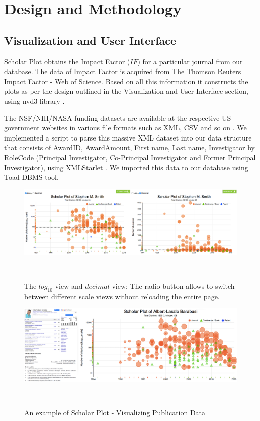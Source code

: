 \chapter{Design and Methodology}\label{chap:Methods }
\section{Visualization and User Interface}
Scholar Plot obtains the Impact Factor ($IF$) for a particular journal from our database. The data of Impact Factor is acquired from The Thomson Reuters Impact Factor - Web of Science. Based on all this information it constructs the plots as per the design outlined in the Visualization and User Interface section, using nvd3 library \cite{nvd3org}.


The NSF/NIH/NASA funding datasets are available at the respective US government websites in various file formats such as XML, CSV and so on \cite{nsf, nih}. We implemented a script to parse this massive XML dataset into our data structure that consists of AwardID, AwardAmount, First name, Last name, Investigator by RoleCode (Principal Investigator, Co-Principal Investigator and Former Principal Investigator), using XMLStarlet \cite{XMLStarlet}. We imported this data to our database using Toad DBMS tool. %

\begin{figure}%
\centering
  \includegraphics[width=1\columnwidth]{figures/fig_scaleView}
  \caption{The $log_{10}$ view and $decimal$ view: The radio button allows to switch between different scale views without reloading the entire page.}~\label{fig:fig-scale}
\end{figure}

\begin{figure}
  \centering
  \includegraphics[width=1\columnwidth]{figures/fig_cv_google_scholarplot}
  \caption{An example of Scholar Plot - Visualizing Publication Data}~\label{fig:fig-publication}
\end{figure}

